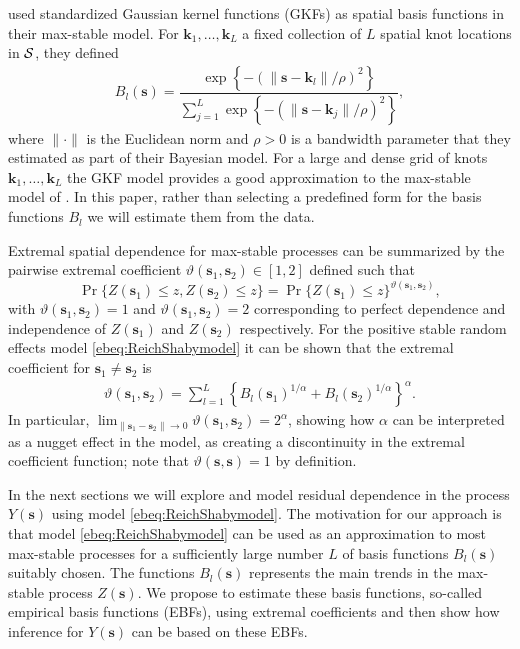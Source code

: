 \documentclass[12pt]{article}
\newcommand{\bk}{\ensuremath{\mathbf{k}}}
\newcommand{\bs}{\ensuremath{\mathbf{s}}}
\newcommand{\calS}{{\cal S}}
\begin{document}
\citet{Reich2012} used standardized Gaussian kernel functions (GKFs) as spatial basis functions in their max-stable model. For $\bk_1, \ldots, \bk_L$ a fixed collection of $L$ spatial knot locations in $\calS$, they defined
\begin{align}\label{eq:gkf}
B_l(\bs) = \dfrac{\exp\left\{- (\|\bs - \bk_l\|/\rho)^2 \right\}}{\sum_{j = 1}^L \exp\left\{- (\|\bs - \bk_j\|/ \rho)^2 \right\}},
\end{align}
where $\|\cdot\|$ is the Euclidean norm and $\rho>0$ is a bandwidth parameter that they estimated as part of their Bayesian model. For a large and dense grid of knots $\bk_1, \ldots, \bk_L$ the GKF model provides a good approximation to the max-stable model of \citet{Smith1990}. In this paper, rather than selecting a predefined form for the basis functions $B_l$ we will estimate them from the data.

Extremal spatial dependence for max-stable processes can be summarized by the pairwise extremal coefficient $\vartheta(\bs_1, \bs_2)\in[1,2]$ defined such that
\begin{equation*}
  \Pr\{Z(\bs_1)\leq z, Z(\bs_2) \leq z\} = \Pr\{Z(\bs_1) \leq z\}^{\vartheta(\bs_1,\bs_2)},
\end{equation*}
with $\vartheta(\bs_1,\bs_2)=1$ and $\vartheta(\bs_1,\bs_2)=2$ corresponding to perfect dependence and independence of $Z(\bs_1)$ and $Z(\bs_2)$ respectively.
For the positive stable random effects model \eqref{ebeq:ReichShabymodel} it can be shown that the extremal coefficient for $\bs_1\neq \bs_2$ is
\begin{align*}
   \vartheta(\bs_1,\bs_2) = \sum_{l=1}^L \left\{B_{l}(\bs_1)^{1/\alpha}+B_{l}(\bs_2)^{1/\alpha}\right\}^\alpha.
\end{align*}
In particular, $\lim_{\|\bs_1-\bs_2\| \rightarrow 0}\vartheta(\bs_1,\bs_2) = 2^{\alpha}$, showing how $\alpha$ can be interpreted as a nugget effect in the model, as creating a discontinuity in the extremal coefficient function; note that $\vartheta(\bs,\bs)=1$ by definition.

In the next sections we will explore and model residual dependence in the process $Y(\bs)$ using model \eqref{ebeq:ReichShabymodel}. The motivation for our approach is that model \eqref{ebeq:ReichShabymodel} can be used as an approximation to most max-stable processes for a sufficiently large number $L$ of basis functions $B_l(\bs)$ suitably chosen. The functions $B_l(\bs)$ represents the main trends in the max-stable process $Z(\bs)$. We propose to estimate these basis functions, so-called empirical basis functions (EBFs), using extremal coefficients and then show how inference for $Y(\bs)$ can be based on these EBFs.
\end{document}
